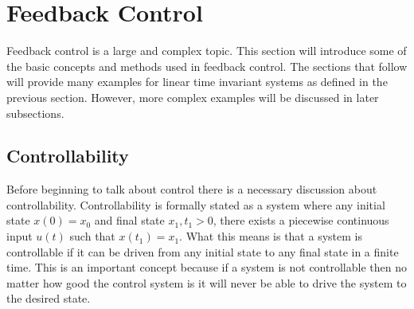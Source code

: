 \section{Feedback Control}

Feedback control is a large and complex topic. This section will
introduce some of the basic concepts and methods used in feedback
control. The sections that follow will provide many examples for linear time invariant systems as defined in the previous section. However, more complex examples will be discussed in later subsections. 

\subsection{Controllability}

Before beginning to talk about control there is a necessary discussion about controllability. Controllability is formally stated as a system where any initial state $x(0)=x_0$ and final state $x_1,t_1>0$, there exists a piecewise continuous input $u(t)$ such that $x(t_1)=x_1$. What this means is that a system is controllable if it can be driven from any initial state to any final state in a finite time. This is an important concept because if a system is not controllable then no matter how good the control system is it will never be able to drive the system to the desired state.

